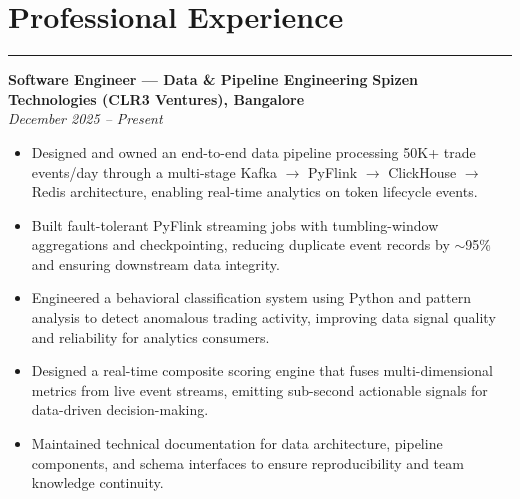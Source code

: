 \documentclass[12pt]{article}
\begin{document}
\section*{Professional Experience}
\vspace{1pt}\hrule\vspace{4pt}

\textbf{Software Engineer --- Data \& Pipeline Engineering} \hfill \textbf{Spizen Technologies (CLR3 Ventures), Bangalore} \\
\textit{December 2025 -- Present}
\begin{itemize}
  \item Designed and owned an end-to-end data pipeline processing 50K+ trade events/day through a multi-stage Kafka $\rightarrow$ PyFlink $\rightarrow$ ClickHouse $\rightarrow$ Redis architecture, enabling real-time analytics on token lifecycle events.
  \item Built fault-tolerant PyFlink streaming jobs with tumbling-window aggregations and checkpointing, reducing duplicate event records by $\sim$95\% and ensuring downstream data integrity.
  \item Engineered a behavioral classification system using Python and pattern analysis to detect anomalous trading activity, improving data signal quality and reliability for analytics consumers.
  \item Designed a real-time composite scoring engine that fuses multi-dimensional metrics from live event streams, emitting sub-second actionable signals for data-driven decision-making.
  \item Maintained technical documentation for data architecture, pipeline components, and schema interfaces to ensure reproducibility and team knowledge continuity.
\end{itemize}
\end{document}
